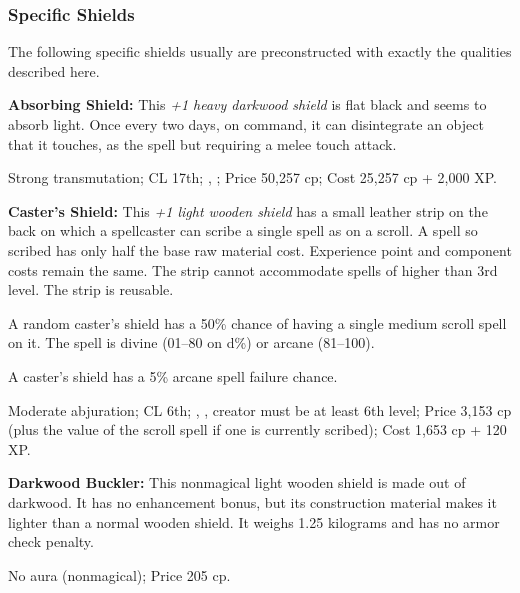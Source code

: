\subsubsection{Specific Shields}
The following specific shields usually are preconstructed with exactly the qualities described here.

\textbf{Absorbing Shield:} This \emph{+1 heavy darkwood shield} is flat black and seems to absorb light. Once every two days, on command, it can disintegrate an object that it touches, as the spell but requiring a melee touch attack.

Strong transmutation; CL 17th; , ; Price 50,257 cp; Cost 25,257 cp + 2,000 XP.

\textbf{Caster's Shield:} This \emph{+1 light wooden shield} has a small leather strip on the back on which a spellcaster can scribe a single spell as on a scroll. A spell so scribed has only half the base raw material cost. Experience point and component costs remain the same. The strip cannot accommodate spells of higher than 3rd level. The strip is reusable.

A random caster's shield has a 50\% chance of having a single medium scroll spell on it. The spell is divine (01--80 on d\%) or arcane (81--100).

A caster's shield has a 5\% arcane spell failure chance.

Moderate abjuration; CL 6th; , , creator must be at least 6th level; Price 3,153 cp (plus the value of the scroll spell if one is currently scribed); Cost 1,653 cp + 120 XP.

\textbf{Darkwood Buckler:} This nonmagical light wooden shield is made out of darkwood. It has no enhancement bonus, but its construction material makes it lighter than a normal wooden shield. It weighs 1.25 kilograms and has no armor check penalty.

No aura (nonmagical); Price 205 cp.



